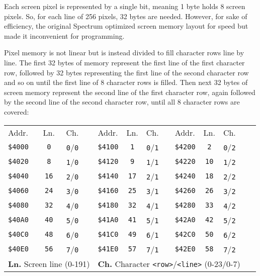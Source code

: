 Each screen pixel is represented by a single bit, meaning 1 byte holds 8 screen pixels. So, for each line of 256 pixels, 32 bytes are needed. However, for sake of efficiency, the original Spectrum optimized screen memory layout for speed but made it inconvenient for programming.

Pixel memory is not linear but is instead divided to fill character rows line by line. The first 32 bytes of memory represent the first line of the first character row, followed by 32 bytes representing the first line of the second character row and so on until the first line of 8 character rows is filled. Then next 32 bytes of screen memory represent the second line of the first character row, again followed by the second line of the second character row, until all 8 character rows are covered:

{
	\newcommand{\PixelTitle}{Addr. & Ln. & Ch.}
	\newcommand{\PixelData}[4]{{\tt \$#1} & {\tt #2} & {\tt #3}/{\tt #4}}

	\begin{tabularx}{0.9\linewidth}{lccXlccXlcccX}
		\addtolength{\tabcolsep}{-2pt}
		\PixelTitle & & \PixelTitle & & \PixelTitle & & \\
		\PixelData{4000}{0}{0}{0} & & \PixelData{4100}{1}{0}{1} & & \PixelData{4200}{2}{0}{2} & & \multirow{8}{*}{\ddd} \\
		\PixelData{4020}{8}{1}{0} & & \PixelData{4120}{9}{1}{1} & & \PixelData{4220}{10}{1}{2} & & \\
		\PixelData{4040}{16}{2}{0} & & \PixelData{4140}{17}{2}{1} & & \PixelData{4240}{18}{2}{2} & & \\
		\PixelData{4060}{24}{3}{0} & & \PixelData{4160}{25}{3}{1} & & \PixelData{4260}{26}{3}{2} & & \\
		\PixelData{4080}{32}{4}{0} & & \PixelData{4180}{32}{4}{1} & & \PixelData{4280}{33}{4}{2} & & \\
		\PixelData{40A0}{40}{5}{0} & & \PixelData{41A0}{41}{5}{1} & & \PixelData{42A0}{42}{5}{2} & & \\
		\PixelData{40C0}{48}{6}{0} & & \PixelData{41C0}{49}{6}{1} & & \PixelData{42C0}{50}{6}{2} & & \\
		\PixelData{40E0}{56}{7}{0} & & \PixelData{41E0}{57}{7}{1} & & \PixelData{42E0}{58}{7}{2} & & \\[1ex]
		\multicolumn{4}{l}{\textbf{Ln.} Screen line (0-191)} & \multicolumn{9}{l}{\textbf{Ch.} Character {\tt <row>}/{\tt <line>} (0-23/0-7)} \\
	\end{tabularx}
}

